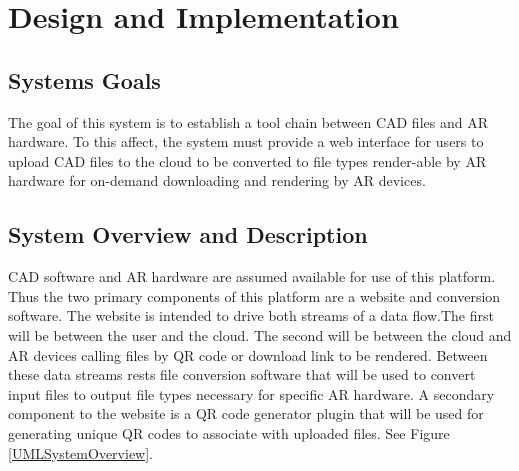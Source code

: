 

\chapter{Design  and Implementation}

\section{Systems Goals}

The goal of this system is to establish a tool chain between CAD files and AR hardware. To this affect, the system must provide a web interface for users to upload CAD files to the cloud to be converted to file types render-able by AR hardware for on-demand downloading and rendering by AR devices. 


\section{System Overview and Description}
CAD software and AR hardware are assumed available for use of this platform. Thus the two primary components of this platform are a website and conversion software. The website is intended to drive both streams of a data flow.The first will be between the user and the cloud. The second will be between the cloud and AR devices calling files by QR code or download link to be rendered.  Between these data streams rests file conversion software that will be used to convert input files to output file types necessary for specific AR hardware. A secondary component to the website is a QR code generator plugin that will be used for generating unique QR codes to associate with uploaded files. See Figure \ref{UMLSystemOverview}.

